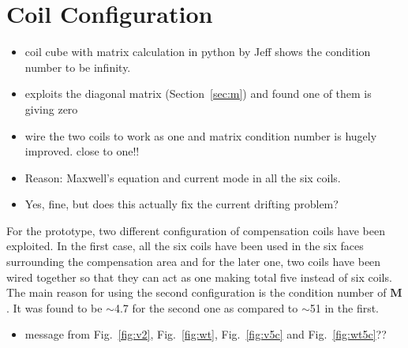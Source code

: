 \section{Coil Configuration}\label{sec:coil_config}


\begin{itemize}
\item coil cube with matrix calculation in python by Jeff shows the condition number to be infinity.
\item exploits the diagonal matrix (Section~\ref{sec:m}) and found one of them is giving zero
\item wire the two coils to work as one and matrix condition number is hugely improved. close to one!!
\item Reason: Maxwell's equation and current mode in all the six coils.
\item Yes, fine, but does this actually fix the current drifting problem?
\end{itemize}




For the prototype, two different configuration of compensation coils have been exploited. In the first case, all the six coils have been used in the six faces surrounding the compensation area and for the later one, two coils have been wired together so that they can act as one making total five instead of six coils. The main reason for using the second configuration is the condition number of $\bm{M}$. It was found to be $\sim$4.7 for the second one as compared to $\sim$51 in the first.

\begin{itemize}
     \item message from Fig.~\ref{fig:v2}, Fig.~\ref{fig:wt}, Fig.~\ref{fig:v5c} and Fig.~\ref{fig:wt5c}??
 \end{itemize}




